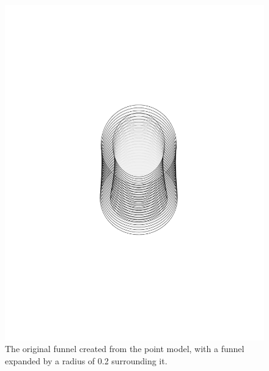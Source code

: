 \begin{figure}
  \centering \includegraphics[clip, trim=6cm 8cm 6cm 8cm,
  scale=.5]{figures/method/expanded-funnel}
  \caption{The original funnel created from the point model, with a funnel
    expanded by a radius of 0.2 surrounding it.}
  \label{fig:expanded-funnel}
\end{figure}

